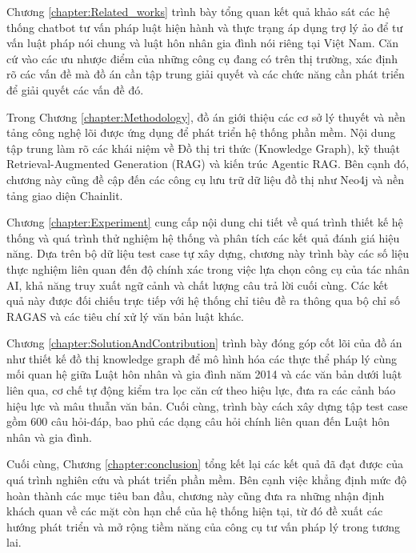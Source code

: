 \documentclass[../DoAn.tex]{subfiles}
\begin{document}
Chương \ref{chapter:Related_works} trình bày tổng quan kết quả khảo sát các hệ thống chatbot tư vấn pháp luật hiện hành và thực trạng áp dụng trợ lý ảo để tư vấn luật pháp nói chung và luật hôn nhân gia đình nói riêng tại Việt Nam. Căn cứ vào các ưu nhược điểm của những công cụ đang có trên thị trường, xác định rõ các vấn đề mà đồ án cần tập trung giải quyết và các chức năng cần phát triển để giải quyết các vấn đề đó.


Trong Chương \ref{chapter:Methodology}, đồ án giới thiệu các cơ sở lý thuyết và nền tảng công nghệ lõi được ứng dụng để phát triển hệ thống phần mềm. Nội dung tập trung làm rõ các khái niệm về Đồ thị tri thức (Knowledge Graph), kỹ thuật Retrieval-Augmented Generation (RAG) và kiến trúc Agentic RAG. Bên cạnh đó, chương này cũng đề cập đến các công cụ lưu trữ dữ liệu đồ thị như Neo4j và nền tảng giao diện Chainlit.


Chương \ref{chapter:Experiment} cung cấp nội dung chi tiết về quá trình thiết kế hệ thống và quá trình thử nghiệm hệ thống và phân tích các kết quả đánh giá hiệu năng. Dựa trên bộ dữ liệu test case tự xây dựng, chương này trình bày các số liệu thực nghiệm liên quan đến độ chính xác trong việc lựa chọn công cụ của tác nhân AI, khả năng truy xuất ngữ cảnh và chất lượng câu trả lời cuối cùng. Các kết quả này được đối chiếu trực tiếp với hệ thống chỉ tiêu đề ra thông qua bộ chỉ số RAGAS và các tiêu chí xử lý văn bản luật khác.


Chương \ref{chapter:SolutionAndContribution} trình bày đóng góp cốt lõi của đồ án như thiết kế đồ thị knowledge graph để mô hình hóa các thực thể pháp lý cùng mối quan hệ giữa Luật hôn nhân và gia đình năm 2014 và các văn bản dưới luật liên qua, cơ chế tự động kiểm tra lọc căn cứ theo hiệu lực, đưa ra các cảnh báo hiệu lực và mâu thuẫn văn bản. Cuối cùng, trình bày cách xây dựng tập test case gồm 600 câu hỏi-đáp, bao phủ các dạng câu hỏi chính liên quan đến Luật hôn nhân và gia đình.


Cuối cùng, Chương \ref{chapter:conclusion} tổng kết lại các kết quả đã đạt được của quá trình nghiên cứu và phát triển phần mềm. Bên cạnh việc khẳng định mức độ hoàn thành các mục tiêu ban đầu, chương này cũng đưa ra những nhận định khách quan về các mặt còn hạn chế của hệ thống hiện tại, từ đó đề xuất các hướng phát triển và mở rộng tiềm năng của công cụ tư vấn pháp lý trong tương lai.
\end{document}
